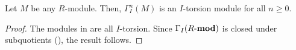 \begin{prop}
	Let $M$ be any $R$-module. Then, $\Gamma^{n}_{I}(M)$ is an $I$-torsion module for all $n \ge 0$.
\end{prop}
\begin{proof} 
	The modules in  are all $I$-torsion. Since $\Gamma_{I}(R\text{-}\mathbf{mod})$ is closed under subquotients (), the result follows.
\end{proof}

